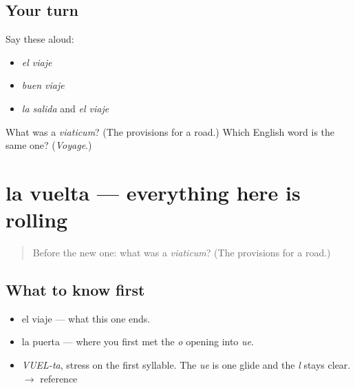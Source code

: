 \subsection*{Your turn}
Say these aloud:

\begin{itemize}
\raggedright
  \item \emph{el viaje}
  \item \emph{buen viaje}
  \item \emph{la salida} and \emph{el viaje}
\end{itemize}

\begin{tcolorbox}[breakable,colback=teal!4,colframe=teal!35!black,title={Before you move on}]
What was a \emph{viaticum}? (The provisions for a road.) Which English word is the same one? (\emph{Voyage}.)
\end{tcolorbox}
\section[la vuelta]{la vuelta — everything here is rolling}

\label{lesson:ES-C288-vuelta}



\begin{quote}
Before the new one: what was a \emph{viaticum}? (The provisions for a road.)
\end{quote}

\subsection*{What to know first}
\begin{itemize}
\raggedright
  \item el viaje — what this one ends.
  \item la puerta — where you first met the \emph{o} opening into \emph{ue}.
\end{itemize}

\begin{sounds}
\begin{itemize}
\raggedright
  \item \emph{VUEL-ta}, stress on the first syllable. The \emph{ue} is one glide and the \emph{l} stays clear. $\to$ reference
\end{itemize}
\end{sounds}

